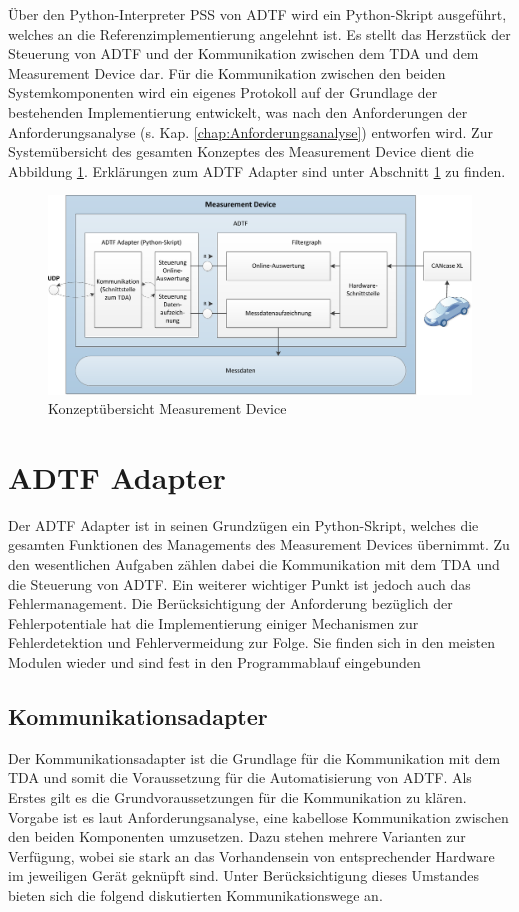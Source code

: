 \documentclass[12pt,a4paper]{report}
\begin{document}
Über den Python-Interpreter PSS von ADTF wird ein Python-Skript ausgeführt, welches an die Referenzimplementierung \cite{MasterEckerlebe} angelehnt ist. Es stellt das Herzstück der Steuerung von ADTF und der Kommunikation zwischen dem TDA und dem Measurement Device dar. Für die Kommunikation zwischen den beiden Systemkomponenten wird ein eigenes Protokoll auf der Grundlage der bestehenden Implementierung entwickelt, was nach den Anforderungen der Anforderungsanalyse (s. Kap. \ref{chap:Anforderungsanalyse}) entworfen wird. Zur Systemübersicht des gesamten Konzeptes des Measurement Device dient die Abbildung \ref{pic:Konzeptuebersicht}. Erklärungen zum ADTF Adapter sind unter Abschnitt \ref{sec:ADTF Adapter} zu finden.
\begin{figure}
\includegraphics[width=1\linewidth]{Darstellungen/Uebersicht_Measurement-Device}
\caption{Konzeptübersicht Measurement Device}\label{pic:Konzeptuebersicht}
\end{figure}
\section{ADTF Adapter}\label{sec:ADTF Adapter}
Der ADTF Adapter ist in seinen Grundzügen ein Python-Skript, welches die gesamten Funktionen des Managements des Measurement Devices übernimmt. Zu den wesentlichen Aufgaben zählen dabei die Kommunikation mit dem TDA und die Steuerung von ADTF. Ein weiterer wichtiger Punkt ist jedoch auch das Fehlermanagement. Die Berücksichtigung der Anforderung bezüglich der Fehlerpotentiale hat die Implementierung einiger Mechanismen zur Fehlerdetektion und Fehlervermeidung zur Folge. Sie finden sich in den meisten Modulen wieder und sind fest in den Programmablauf eingebunden
\subsection{Kommunikationsadapter}\label{subsec:Kommunikationsadapter}
Der Kommunikationsadapter ist die Grundlage für die Kommunikation mit dem TDA und somit die Voraussetzung für die Automatisierung von ADTF. Als Erstes gilt es die Grundvoraussetzungen für die Kommunikation zu klären. Vorgabe ist es laut Anforderungsanalyse, eine kabellose Kommunikation zwischen den beiden Komponenten umzusetzen. Dazu stehen mehrere Varianten zur Verfügung, wobei sie stark an das Vorhandensein von entsprechender Hardware im jeweiligen Gerät geknüpft sind. Unter Berücksichtigung dieses Umstandes bieten sich die folgend diskutierten Kommunikationswege an.
\end{document}
